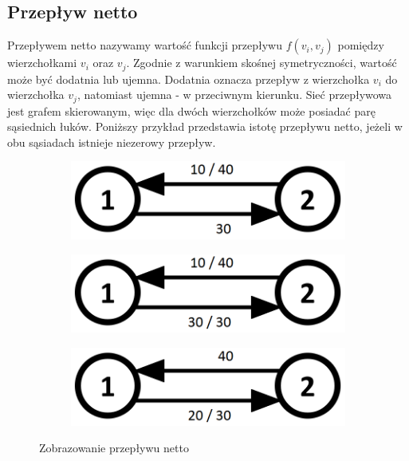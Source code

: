 \subsection{Przepływ netto}\label{ssec:netto}
Przepływem netto nazywamy wartość funkcji przepływu $ f(v_i, v_j) $ pomiędzy wierzchołkami $ v_i $ oraz $ v_j $. Zgodnie z warunkiem skośnej symetryczności, wartość może być dodatnia lub ujemna. Dodatnia oznacza przepływ z wierzchołka $ v_i $ do wierzchołka $ v_j $, natomiast ujemna - w przeciwnym kierunku. Sieć przepływowa jest grafem skierowanym, więc dla dwóch wierzchołków może posiadać parę sąsiednich łuków. Poniższy przykład przedstawia istotę przepływu netto, jeżeli w obu sąsiadach istnieje niezerowy przepływ.
\begin{figure}[h]
	\centering
	\begin{subfigure}{0.25\textwidth}
		\includegraphics[width=0.9\linewidth]{./img/netto1.png} 
		\caption{}
		\label{fig:netto1}
	\end{subfigure}
	\begin{subfigure}{0.25\textwidth}
		\includegraphics[width=0.9\linewidth]{./img/netto2.png}
		\caption{}
		\label{fig:netto2}
	\end{subfigure}
	\begin{subfigure}{0.25\textwidth}
		\includegraphics[width=0.9\linewidth]{./img/netto3.png}
		\caption{}
		\label{fig:netto3}
	\end{subfigure}
	\caption{Zobrazowanie przepływu netto}
	\label{fig:imageNetto}
\end{figure}\vfill
